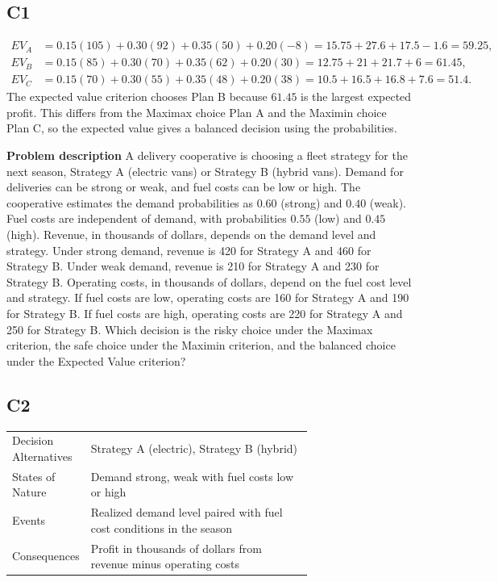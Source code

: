 		\subsection*{C1}
		\[
		\begin{aligned}
		EV_A &= 0.15(105)+0.30(92)+0.35(50)+0.20(-8)=15.75+27.6+17.5-1.6=59.25,\\
		EV_B &= 0.15(85)+0.30(70)+0.35(62)+0.20(30)=12.75+21+21.7+6=61.45,\\
		EV_C &= 0.15(70)+0.30(55)+0.35(48)+0.20(38)=10.5+16.5+16.8+7.6=51.4.
		\end{aligned}
		\]
		The expected value criterion chooses Plan B because $61.45$ is the largest expected profit. This differs from the Maximax choice Plan A and the Maximin choice Plan C, so the expected value gives a balanced decision using the probabilities.


		\textbf{Problem description}
		A delivery cooperative is choosing a fleet strategy for the next season, Strategy A (electric vans)
		or Strategy B (hybrid vans). Demand for deliveries can be strong or weak, and fuel costs can be low or high. The cooperative estimates the demand probabilities as $0.60$ (strong) and $0.40$ (weak). Fuel costs are independent of demand, with probabilities $0.55$ (low) and $0.45$ (high). Revenue, in thousands of dollars, depends on the demand level and strategy. Under strong demand, revenue is 420 for Strategy A and 460 for Strategy B. Under weak demand, revenue is 210 for Strategy A and 230 for Strategy B. Operating costs, in thousands of dollars, depend on the fuel cost level and strategy. If fuel costs are low, operating costs are 160 for Strategy A and 190 for Strategy B. If fuel costs are high, operating costs are 220 for Strategy A and 250 for Strategy B. Which decision is the risky choice under the Maximax criterion, the safe choice under the Maximin criterion, and the balanced choice under the Expected Value criterion?

		\subsection*{C2}
		\begin{center}
			\begin{tabular}{l p{0.74\linewidth}}
				\toprule
				Decision Alternatives & Strategy A (electric), Strategy B (hybrid) \\
				States of Nature & Demand strong, weak with fuel costs low or high \\
				Events & Realized demand level paired with fuel cost conditions in the season \\
				Consequences & Profit in thousands of dollars from revenue minus operating costs \\
				\bottomrule
			\end{tabular}
		\end{center}

